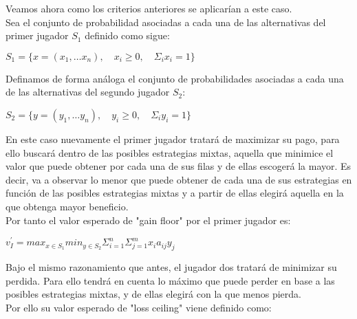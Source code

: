 \documentclass[10pt,a4paper]{book}
\begin{document}
Veamos ahora como los criterios anteriores se aplicarían a este caso.\\

Sea el conjunto de probabilidad asociadas a cada una de las alternativas del primer jugador $S_1$ definido como sigue:\\

\begin{center}

$ S_1 = \{ x=(x_1, \ldots x_n), \quad x_i \geq 0 , \quad \Sigma_i x_i=1  \} $

\end{center}

Definamos de forma análoga el conjunto de probabilidades asociadas a cada una de las alternativas del segundo jugador $S_2$:\\

\begin{center}

$ S_2 = \{ y=(y_1, \ldots y_n), \quad y_i \geq 0 , \quad \Sigma_i y_i=1  \} $

\end{center}


En este caso nuevamente el primer jugador tratará de maximizar su pago, para ello buscará dentro de las posibles estrategias mixtas, aquella que minimice el valor que puede obtener por cada una de sus filas y de ellas escogerá la mayor. Es decir, va a observar lo menor que puede obtener de cada una de sus estrategias en función de las posibles estrategias mixtas y a partir de ellas elegirá aquella en la que obtenga mayor beneficio.\\

Por tanto el valor esperado de "gain floor" por el primer jugador es:\\

\begin{center}

$ v^{'}_I= max_{x \in S_1} min_{y \in S_2} \Sigma^n_{i=1} \Sigma^m_{j=1} x_i a_{ij} y_j$

\end{center}

Bajo el mismo razonamiento que antes, el jugador dos tratará de minimizar su perdida. Para ello tendrá en cuenta lo máximo que puede perder en base a las posibles estrategias mixtas, y de ellas elegirá con la que menos pierda.\\

Por ello su valor esperado de "loss ceiling" viene definido como:\\
\end{document}
